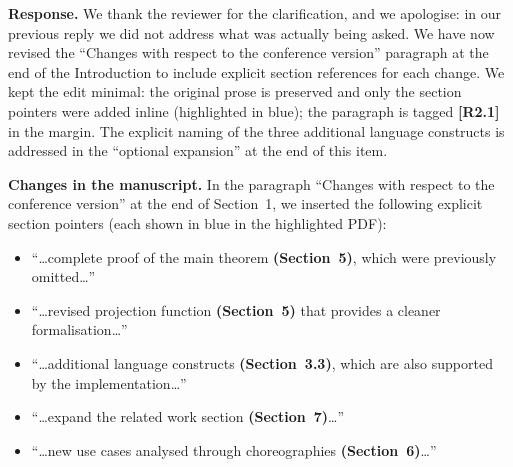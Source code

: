 \documentclass[11pt]{article}
\newcommand{\revresponse}[2][]{%
  \par\noindent\textbf{Response.} #1 #2
}
\newcommand{\revchanges}[2][]{%
  \par\noindent\textbf{Changes in the manuscript.} #1
  #2\par\bigskip
}
\begin{document}
\revresponse{ We thank the reviewer for the clarification, and we
  apologise: in our previous reply we did not address what was
  actually being asked. We have now revised the
  ``Changes with respect to the conference version'' paragraph at the
  end of the Introduction to include explicit section references for
  each change. We kept the edit minimal: the original prose is
  preserved and only the section pointers were added inline
  (highlighted in blue); the paragraph is tagged \textbf{[R2.1]} in
  the margin.  The explicit naming of the three additional language
  constructs is addressed in the ``optional expansion'' at the end of
  this item.}

\revchanges{ In the paragraph ``Changes with respect to the
  conference version'' at the end of Section~1, we inserted the
  following explicit section pointers (each shown in blue in the
  highlighted PDF):
  \begin{itemize}
  \item ``\ldots complete proof of the main theorem
    \textbf{(Section~5)}, which were previously omitted\ldots''
  \item ``\ldots revised projection function \textbf{(Section~5)}
    that provides a cleaner formalisation\ldots''
  \item ``\ldots additional language constructs
    \textbf{(Section~3.3)}, which are also supported by the
    implementation\ldots''
  \item ``\ldots expand the related work section
    \textbf{(Section~7)}\ldots''
  \item ``\ldots new use cases analysed through choreographies
    \textbf{(Section~6)}\ldots''
  \end{itemize}

}
\end{document}
